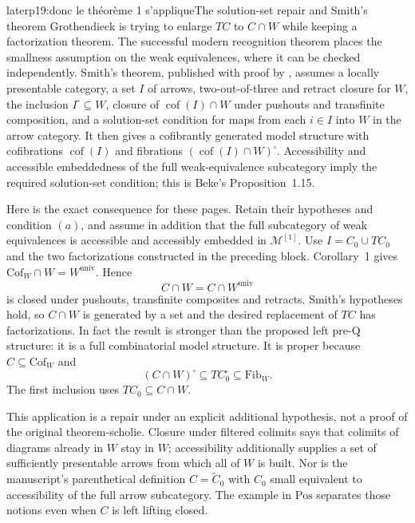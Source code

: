 \begin{dcomment}{later}{p19:donc le théorème 1 s'applique}{The solution-set repair and Smith's theorem}
Grothendieck is trying to enlarge $TC$ to $C\cap W$ while keeping a factorization theorem. The successful modern recognition theorem places the smallness assumption on the weak equivalences, where it can be checked independently. Smith's theorem, published with proof by \citet[Theorem~1.7]{Beke2000}, assumes a locally presentable category, a set $I$ of arrows, two-out-of-three and retract closure for $W$, the inclusion $I^{\square}\subseteq W$, closure of $\operatorname{cof}(I)\cap W$ under pushouts and transfinite composition, and a solution-set condition for maps from each $i\in I$ into $W$ in the arrow category. It then gives a cofibrantly generated model structure with cofibrations $\operatorname{cof}(I)$ and fibrations $(\operatorname{cof}(I)\cap W)^{\square}$. Accessibility and accessible embeddedness of the full weak-equivalence subcategory imply the required solution-set condition; this is Beke's Proposition~1.15.

Here is the exact consequence for these pages. Retain their hypotheses and condition $(a)$, and assume in addition that the full subcategory of weak equivalences is accessible and accessibly embedded in $\mathcal M^{[1]}$. Use $I=C_0\cup TC_0$ and the two factorizations constructed in the preceding block. Corollary~1 gives $\mathrm{Cof}_W\cap W=W^{\mathrm{univ}}$. Hence
\[
 C\cap W=C\cap W^{\mathrm{univ}}
\]
is closed under pushouts, transfinite composites and retracts. Smith's hypotheses hold, so $C\cap W$ is generated by a set and the desired replacement of $TC$ has factorizations. In fact the result is stronger than the proposed left pre-Q structure: it is a full combinatorial model structure. It is proper because $C\subseteq\mathrm{Cof}_W$ and
\[
 (C\cap W)^{\square}\subseteq TC_0^{\square}
       \subseteq\mathrm{Fib}_W.
\]
The first inclusion uses $TC_0\subseteq C\cap W$.

This application is a repair under an explicit additional hypothesis, not a proof of the original theorem-scholie. Closure under filtered colimits says that colimits of diagrams already in $W$ stay in $W$; accessibility additionally supplies a set of sufficiently presentable arrows from which all of $W$ is built. Nor is the manuscript's parenthetical definition $C=\widetilde C_0$ with $C_0$ small equivalent to accessibility of the full arrow subcategory. The example in $\mathrm{Pos}$ separates those notions even when $C$ is left lifting closed.
\end{dcomment}


